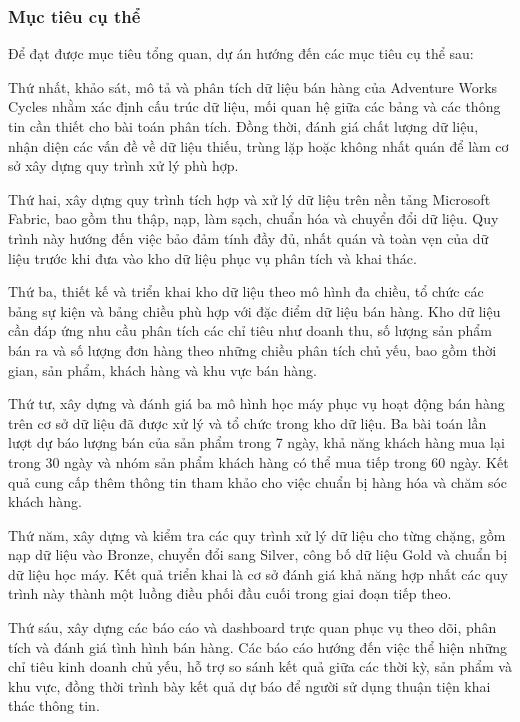 \subsubsection{Mục tiêu cụ thể}

Để đạt được mục tiêu tổng quan, dự án hướng đến các mục tiêu cụ thể sau:

Thứ nhất, khảo sát, mô tả và phân tích dữ liệu bán hàng của Adventure Works Cycles nhằm xác định cấu trúc dữ liệu, mối quan hệ giữa các bảng và các thông tin cần thiết cho bài toán phân tích. Đồng thời, đánh giá chất lượng dữ liệu, nhận diện các vấn đề về dữ liệu thiếu, trùng lặp hoặc không nhất quán để làm cơ sở xây dựng quy trình xử lý phù hợp.

Thứ hai, xây dựng quy trình tích hợp và xử lý dữ liệu trên nền tảng Microsoft Fabric, bao gồm thu thập, nạp, làm sạch, chuẩn hóa và chuyển đổi dữ liệu. Quy trình này hướng đến việc bảo đảm tính đầy đủ, nhất quán và toàn vẹn của dữ liệu trước khi đưa vào kho dữ liệu phục vụ phân tích và khai thác.

Thứ ba, thiết kế và triển khai kho dữ liệu theo mô hình đa chiều, tổ chức các bảng sự kiện và bảng chiều phù hợp với đặc điểm dữ liệu bán hàng. Kho dữ liệu cần đáp ứng nhu cầu phân tích các chỉ tiêu như doanh thu, số lượng sản phẩm bán ra và số lượng đơn hàng theo những chiều phân tích chủ yếu, bao gồm thời gian, sản phẩm, khách hàng và khu vực bán hàng.

Thứ tư, xây dựng và đánh giá ba mô hình học máy phục vụ hoạt động bán hàng trên cơ sở dữ liệu đã được xử lý và tổ chức trong kho dữ liệu. Ba bài toán lần lượt dự báo lượng bán của sản phẩm trong 7 ngày, khả năng khách hàng mua lại trong 30 ngày và nhóm sản phẩm khách hàng có thể mua tiếp trong 60 ngày. Kết quả cung cấp thêm thông tin tham khảo cho việc chuẩn bị hàng hóa và chăm sóc khách hàng.

Thứ năm, xây dựng và kiểm tra các quy trình xử lý dữ liệu cho từng chặng, gồm nạp dữ liệu vào Bronze, chuyển đổi sang Silver, công bố dữ liệu Gold và chuẩn bị dữ liệu học máy. Kết quả triển khai là cơ sở đánh giá khả năng hợp nhất các quy trình này thành một luồng điều phối đầu cuối trong giai đoạn tiếp theo.

Thứ sáu, xây dựng các báo cáo và dashboard trực quan phục vụ theo dõi, phân tích và đánh giá tình hình bán hàng. Các báo cáo hướng đến việc thể hiện những chỉ tiêu kinh doanh chủ yếu, hỗ trợ so sánh kết quả giữa các thời kỳ, sản phẩm và khu vực, đồng thời trình bày kết quả dự báo để người sử dụng thuận tiện khai thác thông tin.

